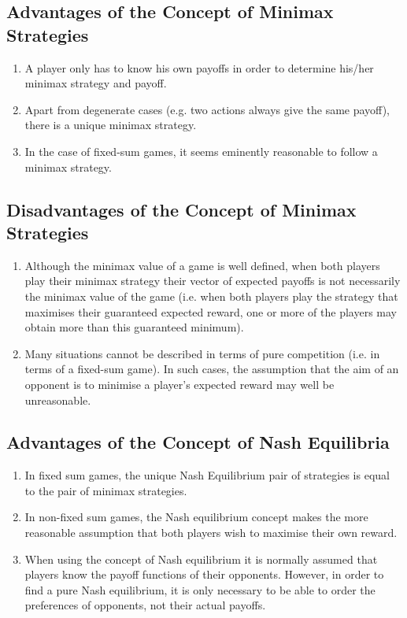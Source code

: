 \documentclass[]{report}
\begin{document}
\subsection{Advantages of the Concept of Minimax Strategies}
\begin{enumerate}
	\item  A player only has to know his own payoffs in order to
	determine his/her minimax strategy and payoff.
	\item  Apart from degenerate cases (e.g. two actions always
	give the same payoff), there is a unique minimax
	strategy.
	\item  In the case of fixed-sum games, it seems eminently
	reasonable to follow a minimax strategy.
\end{enumerate}

\subsection{Disadvantages of the Concept of Minimax Strategies}
\begin{enumerate}
	\item  Although the minimax value of a game is well
	defined, when both players play their minimax
	strategy their vector of expected payoffs is not
	necessarily the minimax value of the game (i.e. when
	both players play the strategy that maximises their
	guaranteed expected reward, one or more of the
	players may obtain more than this guaranteed
	minimum).
\item Many situations cannot be described in terms of pure
	competition (i.e. in terms of a fixed-sum game). In
	such cases, the assumption that the aim of an
	opponent is to minimise a player’s expected reward
	may well be unreasonable.
\end{enumerate}

\subsection{Advantages of the Concept of Nash Equilibria}
\begin{enumerate}
	\item  In fixed sum games, the unique Nash Equilibrium pair
	of strategies is equal to the pair of minimax
	strategies.
	\item  In non-fixed sum games, the Nash equilibrium
	concept makes the more reasonable assumption that
	both players wish to maximise their own reward.
	\item  When using the concept of Nash equilibrium it is
	normally assumed that players know the payoff
	functions of their opponents. However, in order to
	find a pure Nash equilibrium, it is only necessary to
	be able to order the preferences of opponents, not
	their actual payoffs.
\end{enumerate}
\end{document}
